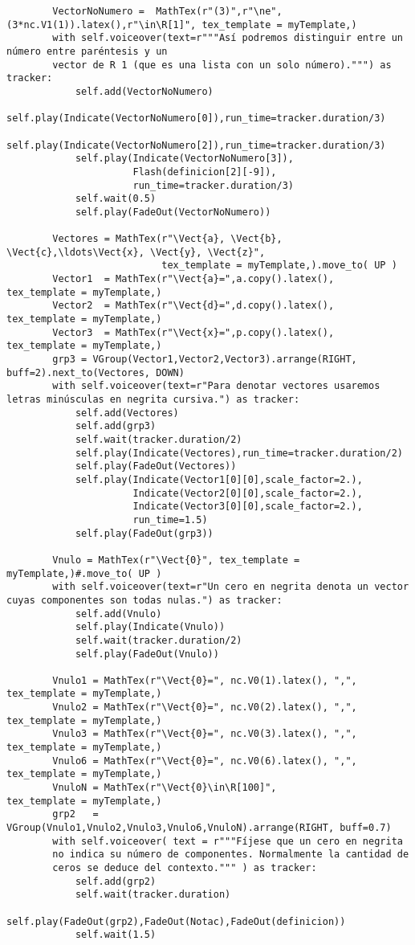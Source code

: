 \documentclass[11pt]{article}
\begin{document}
\begin{verbatim}
        VectorNoNumero =  MathTex(r"(3)",r"\ne",(3*nc.V1(1)).latex(),r"\in\R[1]", tex_template = myTemplate,)
        with self.voiceover(text=r"""Así podremos distinguir entre un número entre paréntesis y un
        vector de R 1 (que es una lista con un solo número).""") as tracker:
            self.add(VectorNoNumero)
            self.play(Indicate(VectorNoNumero[0]),run_time=tracker.duration/3)
            self.play(Indicate(VectorNoNumero[2]),run_time=tracker.duration/3)
            self.play(Indicate(VectorNoNumero[3]),
                      Flash(definicion[2][-9]),
                      run_time=tracker.duration/3)
            self.wait(0.5)
            self.play(FadeOut(VectorNoNumero))
            
        Vectores = MathTex(r"\Vect{a}, \Vect{b}, \Vect{c},\ldots\Vect{x}, \Vect{y}, \Vect{z}",
                           tex_template = myTemplate,).move_to( UP )
        Vector1  = MathTex(r"\Vect{a}=",a.copy().latex(),   tex_template = myTemplate,)
        Vector2  = MathTex(r"\Vect{d}=",d.copy().latex(),   tex_template = myTemplate,)
        Vector3  = MathTex(r"\Vect{x}=",p.copy().latex(),   tex_template = myTemplate,)
        grp3 = VGroup(Vector1,Vector2,Vector3).arrange(RIGHT, buff=2).next_to(Vectores, DOWN)
        with self.voiceover(text=r"Para denotar vectores usaremos letras minúsculas en negrita cursiva.") as tracker:
            self.add(Vectores)
            self.add(grp3)
            self.wait(tracker.duration/2)
            self.play(Indicate(Vectores),run_time=tracker.duration/2)
            self.play(FadeOut(Vectores))
            self.play(Indicate(Vector1[0][0],scale_factor=2.),
                      Indicate(Vector2[0][0],scale_factor=2.),
                      Indicate(Vector3[0][0],scale_factor=2.),
                      run_time=1.5)
            self.play(FadeOut(grp3))
            
        Vnulo = MathTex(r"\Vect{0}", tex_template = myTemplate,)#.move_to( UP )
        with self.voiceover(text=r"Un cero en negrita denota un vector cuyas componentes son todas nulas.") as tracker:
            self.add(Vnulo)
            self.play(Indicate(Vnulo))
            self.wait(tracker.duration/2)
            self.play(FadeOut(Vnulo))
	
        Vnulo1 = MathTex(r"\Vect{0}=", nc.V0(1).latex(), ",",  tex_template = myTemplate,)
        Vnulo2 = MathTex(r"\Vect{0}=", nc.V0(2).latex(), ",",  tex_template = myTemplate,)
        Vnulo3 = MathTex(r"\Vect{0}=", nc.V0(3).latex(), ",",  tex_template = myTemplate,)
        Vnulo6 = MathTex(r"\Vect{0}=", nc.V0(6).latex(), ",",  tex_template = myTemplate,)
        VnuloN = MathTex(r"\Vect{0}\in\R[100]",             tex_template = myTemplate,)
        grp2   = VGroup(Vnulo1,Vnulo2,Vnulo3,Vnulo6,VnuloN).arrange(RIGHT, buff=0.7)
        with self.voiceover( text = r"""Fíjese que un cero en negrita
        no indica su número de componentes. Normalmente la cantidad de
        ceros se deduce del contexto.""" ) as tracker:
            self.add(grp2)
            self.wait(tracker.duration)
            self.play(FadeOut(grp2),FadeOut(Notac),FadeOut(definicion))
            self.wait(1.5)


\end{verbatim}
\end{document}
